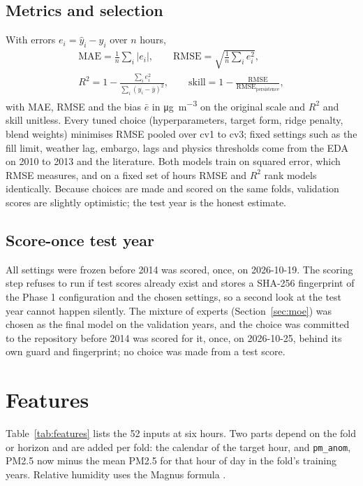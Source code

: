 \documentclass[conference]{IEEEtran}
\newcommand{\ugm}{\si{\micro\gram\per\cubic\metre}}
\newcommand{\col}[1]{\texttt{#1}}
\begin{document}
\subsection{Metrics and selection}
With errors $e_i = \hat{y}_i - y_i$ over $n$ hours,
\begin{gather}
\text{MAE} = \frac{1}{n}\sum_i |e_i|, \qquad \text{RMSE} = \sqrt{\frac{1}{n}\sum_i e_i^2}, \\
R^2 = 1 - \frac{\sum_i e_i^2}{\sum_i (y_i - \bar{y})^2}, \qquad \text{skill} = 1 - \frac{\text{RMSE}}{\text{RMSE}_{\text{persistence}}},
\end{gather}
with MAE, RMSE and the bias $\bar{e}$ in \ugm{} on the original scale and $R^2$ and skill unitless. Every tuned choice (hyperparameters, target form, ridge penalty, blend weights) minimises RMSE pooled over cv1 to cv3; fixed settings such as the fill limit, weather lag, embargo, lags and physics thresholds come from the EDA on 2010 to 2013 and the literature. Both models train on squared error, which RMSE measures, and on a fixed set of hours RMSE and $R^2$ rank models identically. Because choices are made and scored on the same folds, validation scores are slightly optimistic; the test year is the honest estimate.

\subsection{Score-once test year}
All settings were frozen before 2014 was scored, once, on 2026-10-19. The scoring step refuses to run if test scores already exist and stores a SHA-256 fingerprint of the Phase 1 configuration and the chosen settings, so a second look at the test year cannot happen silently. The mixture of experts (Section~\ref{sec:moe}) was chosen as the final model on the validation years, and the choice was committed to the repository before 2014 was scored for it, once, on 2026-10-25, behind its own guard and fingerprint; no choice was made from a test score.

\section{Features}
\label{sec:features}
Table~\ref{tab:features} lists the 52 inputs at six hours. Two parts depend on the fold or horizon and are added per fold: the calendar of the target hour, and \col{pm\_anom}, PM2.5 now minus the mean PM2.5 for that hour of day in the fold's training years. Relative humidity uses the Magnus formula \cite{alduchov1996}.
\end{document}
